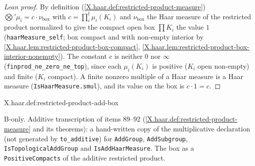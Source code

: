\begin{proof}[Lean proof]
By definition (\cref{X.haar.def:restricted-product-measure}) $\bigotimes'\mu_i=c\cdot\nu_{\mathrm{box}}$ with $c=\prod^{\mathrm f}_i\mu_i(K_i)$ and $\nu_{\mathrm{box}}$ the Haar measure of the restricted product normalized to give the compact open box $\prod K_i$ the value $1$ (\texttt{haarMeasure\_self}; box compact and with non-empty interior by \cref{X.haar.lem:restricted-product-box-compact}, \cref{X.haar.lem:restricted-product-box-interior-nonempty}). The constant $c$ is neither $0$ nor $\infty$ (\texttt{finprod\_ne\_zero\_ne\_top}), since each $\mu_i(K_i)$ is positive ($K_i$ open non-empty) and finite ($K_i$ compact). A finite nonzero multiple of a Haar measure is a Haar measure (\texttt{IsHaarMeasure.smul}), and its value on the box is $c\cdot1=c$.
\end{proof}

\begin{definition}
\bonly
{}
\end{definition}
\begin{tfformal}{X.haar.def:restricted-product-add-box}
\begin{tffidelity}
B-only. Additive transcription of items 89--92 (\cref{X.haar.def:restricted-product-measure} and its theorems): a hand-written copy of the multiplicative declaration (not generated by \texttt{to\_additive}) for \texttt{AddGroup}, \texttt{AddSubgroup}, \texttt{IsTopologicalAddGroup} and \texttt{IsAddHaarMeasure}. The box as a \texttt{PositiveCompacts} of the additive restricted product.
\end{tffidelity}
\end{tfformal}


